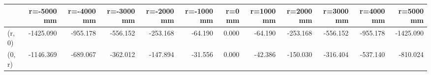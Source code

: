 \documentclass[convert={convertexe={magick.exe}}]{standalone}
\begin{document}
\begin{tabular}{lrrrrrrrrrrr}
\toprule
{} &  r=-5000 mm &  r=-4000 mm &  r=-3000 mm &  r=-2000 mm &  r=-1000 mm &  r=0 mm &  r=1000 mm &  r=2000 mm &  r=3000 mm &  r=4000 mm &  r=5000 mm \\
\midrule
(r, 0) &   -1425.090 &    -955.178 &    -556.152 &    -253.168 &     -64.190 &   0.000 &    -64.190 &   -253.168 &   -556.152 &   -955.178 &  -1425.090 \\
(0, r) &   -1146.369 &    -689.067 &    -362.012 &    -147.894 &     -31.556 &   0.000 &    -42.386 &   -150.030 &   -316.404 &   -537.140 &   -810.024 \\
\bottomrule
\end{tabular}
\end{document}
